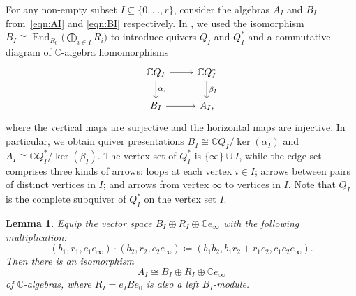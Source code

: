 \documentclass[10pt,a4paper]{amsart}
\newtheorem{Lemma}[Theorem]{Lemma}
\newcommand{\SC}{\mathbb{C}} %
\newcommand{\C}{\SC} %
\newcommand{\End}{\operatorname{End}}
\newcommand{\PiGamma}{B}
\newcommand{\PiQ}{A}
\numberwithin{equation}{section}
\begin{document}
For any non-empty subset $I \subseteq \{0,\dots,r\}$, consider the algebras $\PiQ_I$ and $\PiGamma_I$ from~\eqref{eqn:AI} and \eqref{eqn:BI} respectively.
 In \cite[Proposition~3.3]{craw2019punctual}, we used the isomorphism $\PiGamma_I\cong \End_{R_0}\big(\bigoplus_{i\in I} R_i\big)$ to introduce quivers $Q_I$ and $Q_I^*$ and a commutative diagram of $\C$-algebra homomorphisms
 \begin{equation*}
\begin{tikzcd}
 \C Q_I \ar[d,"\alpha_I"]\ar[r] & \C Q_I^* \ar[d,"\beta_I"] \\
 \PiGamma_I \ar[r] & \PiQ_I,
 \end{tikzcd}
 \end{equation*}
 where the vertical maps are surjective and the horizontal maps are injective. In particular, we obtain quiver presentations $\PiGamma_I\cong \C Q_I/\ker(\alpha_I)$ and $\PiQ_I\cong \C Q_I^*/\ker(\beta_I)$. The vertex set of $Q^*_I$ is $\{\infty\}\cup I$, while the
edge set
comprises three kinds of arrows: loops at each vertex $i\in I$; arrows between pairs of
distinct vertices in $I$; and
arrows
from vertex $\infty$ to vertices in $I$.
Note that $Q_I$ is the complete
subquiver of $Q_I^*$ on the vertex set $I$.


\begin{Lemma}\label{lem_general_I}
Equip the vector space $\PiGamma_I \oplus R_I \oplus \SC e_\infty$ with the following multiplication:
\[ (b_1,r_1,c_1e_\infty) \cdot (b_2,r_2,c_2e_\infty) \coloneqq (b_1b_2,b_1r_2+r_1c_2,c_1c_2e_\infty). \]
Then there is an isomorphism
\begin{equation*}
\PiQ_I \cong \PiGamma_I \oplus R_I \oplus \SC e_\infty
\end{equation*}
of $\SC$-algebras, where $R_I=e_I \PiGamma e_0$ is also a left $\PiGamma_I$-module.
\end{Lemma}
\end{document}
